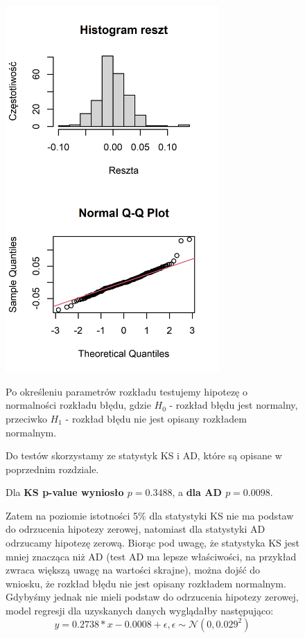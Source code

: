 \documentclass[a4paper,11pt]{article}
\begin{document}
\begin{figure}[h]
\begin{minipage}{0.4\textwidth}
\includegraphics[height=14cm]{img/reg_hist_i_qq_ver.png}
\end{minipage}
\hfill
\begin{minipage}{0.5\textwidth}
\hspace*{0.4cm}Po określeniu parametrów rozkładu testujemy hipotezę o normalności rozkładu błędu, gdzie \(H_0\) - rozkład błędu jest normalny, przeciwko \(H_1\) - rozkład błędu nie jest opisany rozkładem normalnym.

\hspace*{0.4cm}Do testów skorzystamy ze statystyk KS i AD, które są opisane w poprzednim rozdziale.

\hspace*{0.4cm}Dla \textbf{KS p-value wyniosło \(p=0.3488\)}, a \textbf{dla AD \(p=0.0098\)}.

\hspace*{0.4cm}Zatem na poziomie istotności 5\% dla statystyki KS nie ma podstaw do odrzucenia hipotezy zerowej, natomiast dla statystyki AD odrzucamy hipotezę zerową. Biorąc pod uwagę, że statystyka KS jest mniej znacząca niż AD (test AD ma lepsze właściwości, na przykład zwraca większą uwagę na wartości skrajne), można dojść do wniosku, że rozkład błędu nie jest opisany rozkładem normalnym. Gdybyśmy jednak nie mieli podstaw do odrzucenia hipotezy zerowej, model regresji dla uzyskanych danych wyglądałby następująco:
\[y = 0.2738 * x - 0.0008 + \epsilon, \epsilon \sim \mathcal{N}(0, 0.029^2 )\]


\end{minipage}
\end{figure}
\end{document}
